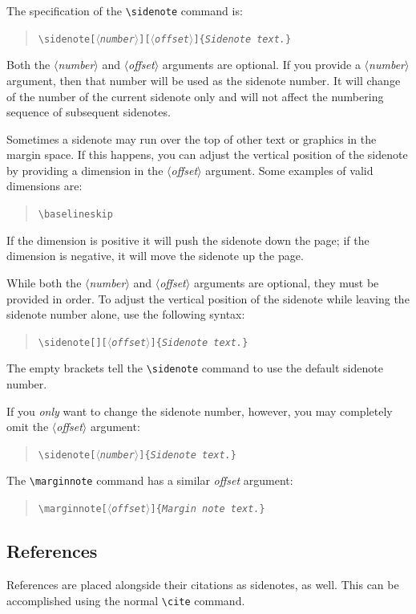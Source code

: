 \documentclass{tufte-handout}
\newcommand{\doccmd}[1]{\texttt{\textbackslash#1}}%
\newcommand{\docopt}[1]{\ensuremath{\langle}\textrm{\textit{#1}}\ensuremath{\rangle}}%
\newcommand{\docarg}[1]{\textrm{\textit{#1}}}%
\newenvironment{docspec}{\begin{quote}\noindent}{\end{quote}}%
\begin{document}
The specification of the \Verb|\sidenote| command is:
\begin{docspec}
  \doccmd{sidenote[\docopt{number}][\docopt{offset}]\{\docarg{Sidenote text.}\}}
\end{docspec}

Both the \docopt{number} and \docopt{offset} arguments are optional.  If you
provide a \docopt{number} argument, then that number will be used as the
sidenote number.  It will change of the number of the current sidenote only and
will not affect the numbering sequence of subsequent sidenotes.

Sometimes a sidenote may run over the top of other text or graphics in the
margin space.  If this happens, you can adjust the vertical position of the
sidenote by providing a dimension in the \docopt{offset} argument.  Some
examples of valid dimensions are:
\begin{docspec}
  \ttfamily 1.0in \qquad 2.54cm \qquad 254mm \Verb|\baselineskip|
\end{docspec}
If the dimension is positive it will push the sidenote down the page; if the
dimension is negative, it will move the sidenote up the page.

While both the \docopt{number} and \docopt{offset} arguments are optional, they
must be provided in order.  To adjust the vertical position of the sidenote
while leaving the sidenote number alone, use the following syntax:
\begin{docspec}
  \doccmd{sidenote[][\docopt{offset}]\{\docarg{Sidenote text.}\}}
\end{docspec}
The empty brackets tell the \Verb|\sidenote| command to use the default
sidenote number.

If you \emph{only} want to change the sidenote number, however, you may
completely omit the \docopt{offset} argument:
\begin{docspec}
  \doccmd{sidenote[\docopt{number}]\{\docarg{Sidenote text.}\}}
\end{docspec}

The \Verb|\marginnote| command has a similar \docarg{offset} argument:
\begin{docspec}
  \doccmd{marginnote[\docopt{offset}]\{\docarg{Margin note text.}\}}
\end{docspec}

\subsection{References}
References are placed alongside their citations as sidenotes,
as well.  This can be accomplished using the normal \Verb|\cite|
command.
\end{document}
